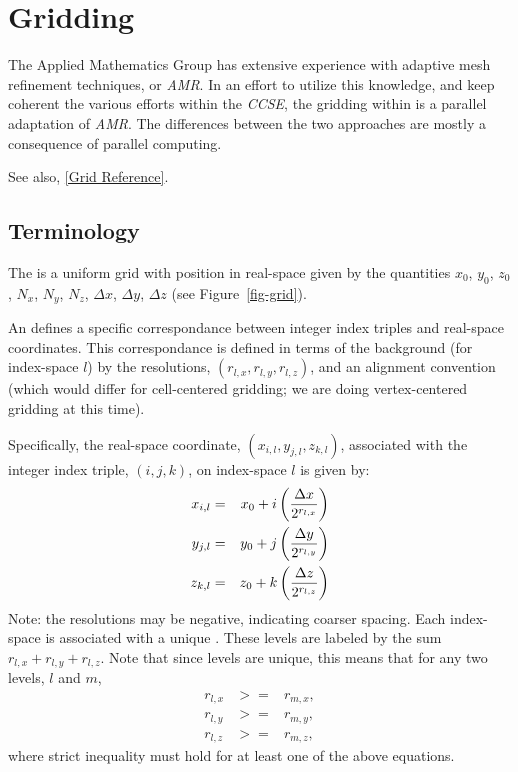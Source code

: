 
\chapter{Gridding}
\label{Gridding}

The Applied Mathematics Group has extensive experience with adaptive
mesh refinement techniques, or {\em AMR}.
In an effort to utilize this knowledge, and keep coherent the various
efforts within the {\em CCSE}, the gridding within \parflow{} is
a parallel adaptation of {\em AMR}.
The differences between the two approaches are mostly a consequence
of parallel computing.

See also, \ref{Grid Reference}.


\section{Terminology}
\label{Terminology}

The  is a uniform grid with position in
real-space given by the quantities
$x_0$, $y_0$, $z_0$, $N_x$, $N_y$, $N_z$, $\Delta x$, $\Delta y$, $\Delta z$
(see Figure~\ref{fig-grid}).

An  defines a specific correspondance between
integer index triples and real-space coordinates.
This correspondance is defined in terms of the background
(for index-space $l$)
by the resolutions, $(r_{l,x}, r_{l,y}, r_{l,z})$,
and an alignment convention (which would differ for cell-centered
gridding; we are doing vertex-centered gridding at this time).

Specifically, the real-space coordinate, $(x_{i,l}, y_{j,l}, z_{k,l})$,
associated with the integer index triple, $(i, j, k)$,
on index-space $l$ is given by:
\begin{eqnarray}
x_{i,l} & = & x_0 + i \left( {{\Delta x} \over {2^{r_{l,x}}}} \right) \\
y_{j,l} & = & y_0 + j \left( {{\Delta y} \over {2^{r_{l,y}}}} \right) \\
z_{k,l} & = & z_0 + k \left( {{\Delta z} \over {2^{r_{l,z}}}} \right)
\end{eqnarray}
Note: the resolutions may be negative, indicating coarser spacing.
Each index-space is associated with a unique .
These levels are labeled by the sum $r_{l,x} + r_{l,y} + r_{l,z}$.
Note that since levels are unique, this means that for any two
levels, $l$ and $m$,
\begin{eqnarray}
r_{l,x} & >= & r_{m,x}, \\
r_{l,y} & >= & r_{m,y}, \\
r_{l,z} & >= & r_{m,z},
\end{eqnarray}
where strict inequality must hold for at least one of the above
equations.

